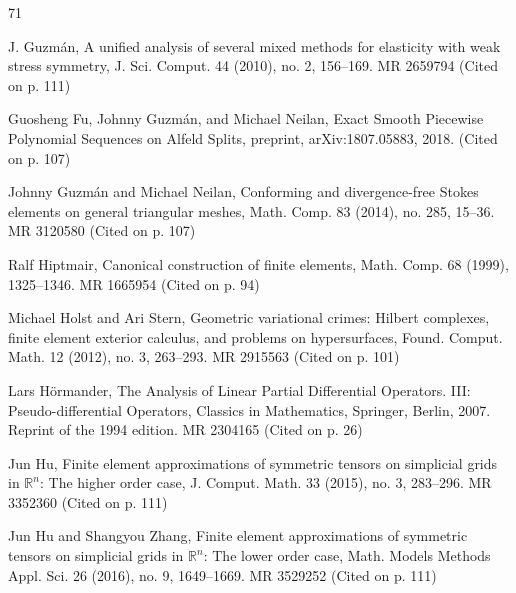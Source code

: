 \begin{MBSourceBibliography}{71}
\item\label{bib:source-47}J. Guzmán, A unified analysis of several mixed methods for elasticity with weak stress symmetry, J. Sci. Comput. 44 (2010), no. 2, 156–169. MR 2659794 (Cited on p. 111)

\item\label{bib:source-48}Guosheng Fu, Johnny Guzmán, and Michael Neilan, Exact Smooth Piecewise Polynomial Sequences on Alfeld Splits, preprint, arXiv:1807.05883, 2018. (Cited on p. 107)

\item\label{bib:source-49}Johnny Guzmán and Michael Neilan, Conforming and divergence-free Stokes elements on general triangular meshes, Math. Comp. 83 (2014), no. 285, 15–36. MR 3120580 (Cited on p. 107)

\item\label{bib:source-50}Ralf Hiptmair, Canonical construction of finite elements, Math. Comp. 68 (1999), 1325–1346. MR 1665954 (Cited on p. 94)

\item\label{bib:source-51}Michael Holst and Ari Stern, Geometric variational crimes: Hilbert complexes, finite element exterior calculus, and problems on hypersurfaces, Found. Comput. Math. 12 (2012), no. 3, 263–293. MR 2915563 (Cited on p. 101)

\item\label{bib:source-52}Lars Hörmander, \newline The Analysis of Linear Partial Differential Operators. III: Pseudo-differential Operators, Classics in Mathematics, Springer, Berlin, 2007. Reprint of the 1994 edition. MR 2304165 (Cited on p. 26)

\item\label{bib:source-53}Jun Hu, Finite element approximations of symmetric tensors on simplicial grids in $\mathbb R^n$: The higher order case, J. Comput. Math. 33 (2015), no. 3, 283–296. MR 3352360 (Cited on p. 111)

\item\label{bib:source-54}Jun Hu and Shangyou Zhang, Finite element approximations of symmetric tensors on simplicial grids in $\mathbb R^n$: The lower order case, Math. Models Methods Appl. Sci. 26 (2016), no. 9, 1649–1669. MR 3529252 (Cited on p. 111)


\end{MBSourceBibliography}
